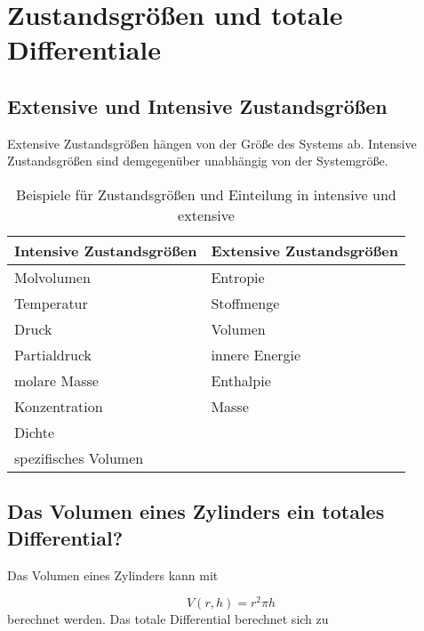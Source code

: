 \section{Zustandsgrößen und totale Differentiale}

  \subsection{Extensive und Intensive Zustandsgrößen}

    Extensive Zustandsgrößen hängen von der Größe des Systems ab. Intensive   Zustandsgrößen sind demgegenüber unabhängig von der Systemgröße.

      \begin{table}[H]
        \centering
        \caption[Beispiele für Zustandsgrößen, Quelle: Autor]{Beispiele für Zustandsgrößen und Einteilung in intensive und extensive}
        \label{tab:Zustande}
        
        \begin{tabular}{@{}l|l@{}}
          \toprule
            Intensive Zustandsgrößen & Extensive Zustandsgrößen  \\ \midrule
            Molvolumen & Entropie \\
            Temperatur & Stoffmenge \\
            Druck & Volumen \\
            Partialdruck & innere Energie \\
            molare Masse & Enthalpie \\
            Konzentration & Masse \\
            Dichte &  \\
            spezifisches Volumen & \\ \bottomrule
        \end{tabular}
      \end{table}

  \subsection{Das Volumen eines Zylinders ein totales Differential?}
  
    Das Volumen eines Zylinders kann mit
      
      \begin{equation}
        V(r,h) = r^2 \pi h \label{eq:VolumenZylinder}
      \end{equation}            
    berechnet werden. Das totale Differential berechnet sich zu
    
